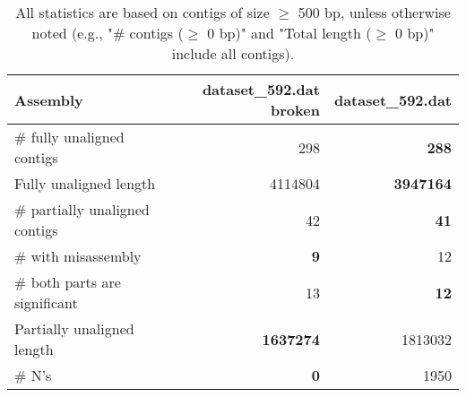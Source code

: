 \documentclass[12pt,a4paper]{article}
\begin{document}
\begin{table}[ht]
\begin{center}
\caption{All statistics are based on contigs of size $\geq$ 500 bp, unless otherwise noted (e.g., "\# contigs ($\geq$ 0 bp)" and "Total length ($\geq$ 0 bp)" include all contigs).}
\begin{tabular}{|l*{2}{|r}|}
\hline
Assembly & dataset\_592.dat broken & dataset\_592.dat \\ \hline
\# fully unaligned contigs & 298 & {\bf 288} \\ \hline
Fully unaligned length & 4114804 & {\bf 3947164} \\ \hline
\# partially unaligned contigs & 42 & {\bf 41} \\ \hline
\hspace{5mm}\# with misassembly & {\bf 9} & 12 \\ \hline
\hspace{5mm}\# both parts are significant & 13 & {\bf 12} \\ \hline
Partially unaligned length & {\bf 1637274} & 1813032 \\ \hline
\# N's & {\bf 0} & 1950 \\ \hline
\end{tabular}
\end{center}
\end{table}
\end{document}
